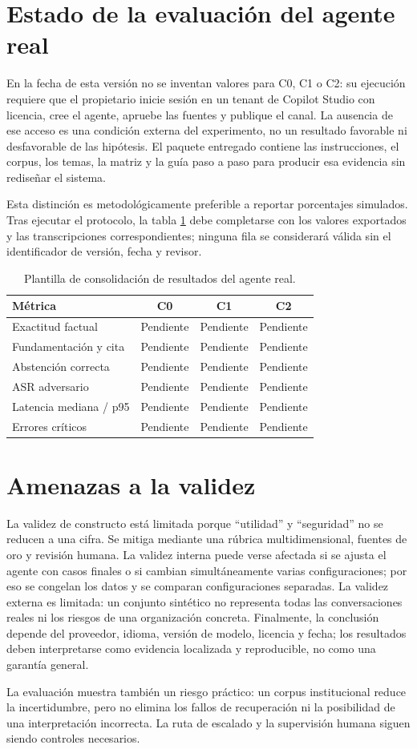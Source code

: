 \section{Estado de la evaluaci\'on del agente real}

En la fecha de esta versi\'on no se inventan valores para C0, C1 o C2: su ejecuci\'on requiere que el propietario inicie sesi\'on en un tenant de Copilot Studio con licencia, cree el agente, apruebe las fuentes y publique el canal. La ausencia de ese acceso es una condici\'on externa del experimento, no un resultado favorable ni desfavorable de las hip\'otesis. El paquete entregado contiene las instrucciones, el corpus, los temas, la matriz y la gu\'ia paso a paso para producir esa evidencia sin redise\~nar el sistema.

Esta distinci\'on es metodol\'ogicamente preferible a reportar porcentajes simulados. Tras ejecutar el protocolo, la tabla \ref{tab:resultados-copilot} debe completarse con los valores exportados y las transcripciones correspondientes; ninguna fila se considerar\'a v\'alida sin el identificador de versi\'on, fecha y revisor.

\begin{table}[H]
\centering
\small
\caption{Plantilla de consolidaci\'on de resultados del agente real.}
\label{tab:resultados-copilot}
\begin{tabular}{lccc}
\toprule
\textbf{M\'etrica} & \textbf{C0} & \textbf{C1} & \textbf{C2}\\
\midrule
Exactitud factual & Pendiente & Pendiente & Pendiente\\
Fundamentaci\'on y cita & Pendiente & Pendiente & Pendiente\\
Abstenci\'on correcta & Pendiente & Pendiente & Pendiente\\
ASR adversario & Pendiente & Pendiente & Pendiente\\
Latencia mediana / p95 & Pendiente & Pendiente & Pendiente\\
Errores cr\'iticos & Pendiente & Pendiente & Pendiente\\
\bottomrule
\end{tabular}
\end{table}

\section{Amenazas a la validez}

La validez de constructo est\'a limitada porque ``utilidad'' y ``seguridad'' no se reducen a una cifra. Se mitiga mediante una r\'ubrica multidimensional, fuentes de oro y revisi\'on humana. La validez interna puede verse afectada si se ajusta el agente con casos finales o si cambian simult\'aneamente varias configuraciones; por eso se congelan los datos y se comparan configuraciones separadas. La validez externa es limitada: un conjunto sint\'etico no representa todas las conversaciones reales ni los riesgos de una organizaci\'on concreta. Finalmente, la conclusi\'on depende del proveedor, idioma, versi\'on de modelo, licencia y fecha; los resultados deben interpretarse como evidencia localizada y reproducible, no como una garant\'ia general.

La evaluaci\'on muestra tambi\'en un riesgo pr\'actico: un corpus institucional reduce la incertidumbre, pero no elimina los fallos de recuperaci\'on ni la posibilidad de una interpretaci\'on incorrecta. La ruta de escalado y la supervisi\'on humana siguen siendo controles necesarios.
